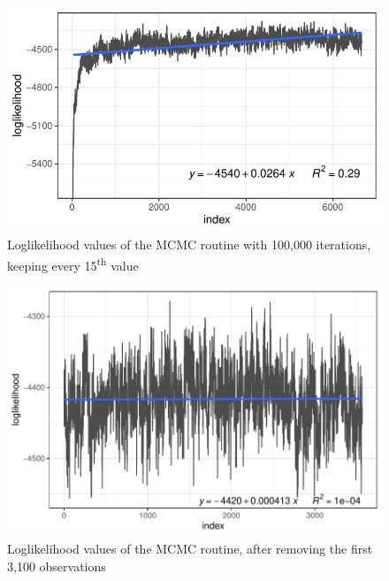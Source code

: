 \documentclass[12pt,a4paper]{article}
\begin{document}
\begin{figure}[ht]
	\centering
  \includegraphics[]{figures/mcmc_before_burnin_fitted.pdf}
	\caption{Loglikelihood values of the MCMC routine with 100,000 iterations, keeping every 15\textsuperscript{th} value}
	\label{fig_mcmc}
\end{figure}

\begin{figure}[ht]
	\centering
  \includegraphics[scale = 0.8]{figures/mcmc_after_burnin_fitted.pdf}
	\caption{Loglikelihood values of the MCMC routine, after removing the first 3,100 observations}
	\label{fig_mcmc_burnin}
\end{figure}
\end{document}
